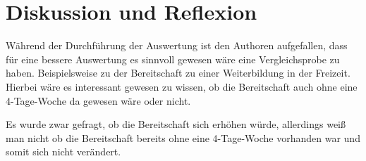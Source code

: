 \chapter{Diskussion und Reflexion}


Während der Durchführung der Auswertung ist den Authoren aufgefallen, dass für eine bessere Auswertung
es sinnvoll gewesen wäre eine Vergleichsprobe zu haben. Beispielsweise zu der Bereitschaft zu einer
Weiterbildung in der Freizeit. Hierbei wäre es interessant gewesen zu wissen, ob die Bereitschaft
auch ohne eine 4-Tage-Woche da gewesen wäre oder nicht.

Es wurde zwar gefragt, ob die Bereitschaft sich erhöhen würde, allerdings weiß man nicht
ob die Bereitschaft bereits ohne eine 4-Tage-Woche vorhanden war und somit sich nicht verändert. 